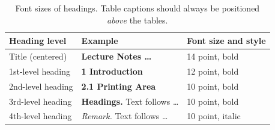 \begin{table}[tb]
  \caption{Font sizes of headings. 
    Table captions should always be positioned \emph{above} the tables.
  }
  \label{tab:headings}
  \centering
  \begin{tabular}{@{}lll@{}}
    \toprule
    Heading level & Example & Font size and style\\
    \midrule
    Title (centered)  & {\Large\bf Lecture Notes \dots} & 14 point, bold\\
    1st-level heading & {\large\bf 1 Introduction} & 12 point, bold\\
    2nd-level heading & {\bf 2.1 Printing Area} & 10 point, bold\\
    3rd-level heading & {\bf Headings.} Text follows \dots & 10 point, bold\\
    4th-level heading & {\it Remark.} Text follows \dots & 10 point, italic\\
  \bottomrule
  \end{tabular}
\end{table}